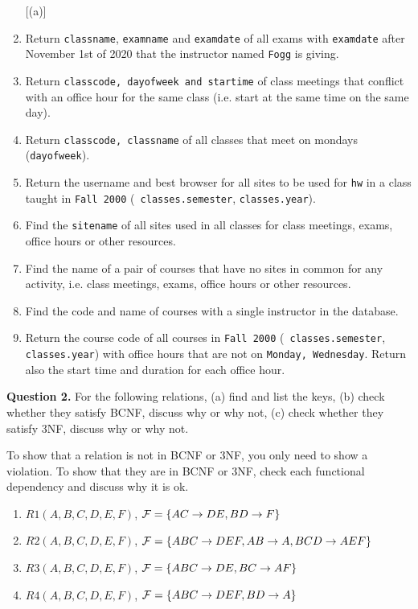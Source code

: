 \documentclass[11pt]{article}
\begin{document}
\begin{enumerate}  [(a)]
\item Return {\tt classname}, {\tt examname} and {\tt examdate} of
  all exams with {\tt examdate} after November 1st of 2020 that the
  instructor named {\tt Fogg} is giving.

\item Return {\tt classcode, dayofweek and startime} of class meetings
  that conflict with an office hour for the same class (i.e. start at
  the same time on the same day).
  
\item Return {\tt classcode, classname} of all classes that meet on
  mondays ({\tt dayofweek}).
  
\item Return the username and best browser for all sites to be used
  for {\tt hw} in a class taught in {\tt Fall 2000} ({\tt
    classes.semester}, {\tt classes.year}).  

\item Find the {\tt sitename} of all sites used in all classes for
  class meetings, exams, office hours or other resources.

\item Find the name of a pair of courses that have no sites in common
  for any activity, i.e. class meetings, exams, office hours or other
  resources.

\item Find the code and name of courses with a single instructor in
  the database.

\item Return the course code of all courses in {\tt Fall 2000} ({\tt
  classes.semester}, {\tt classes.year}) with office hours that are
  not on {\tt Monday, Wednesday}. Return also the start time and duration
  for each office hour.
\end{enumerate}

{\bf Question 2.} For the following relations, (a) find and list the
keys, (b) check whether they satisfy BCNF, discuss why or why not, (c)
check whether they satisfy 3NF, discuss why or why not.

To show that a relation is not in BCNF or 3NF, you only need to show a
violation. To show that they are in BCNF or 3NF, check each functional
dependency and discuss why it is ok.

\begin{enumerate}

\item $R1(A,B,C,D,E,F)$, ${\cal F} = \{AC\rightarrow DE, BD\rightarrow F \}$

\item $R2(A,B,C,D,E,F)$, ${\cal F} = \{ABC\rightarrow DEF,
  AB\rightarrow A, BCD\rightarrow AEF \}$

\item $R3(A,B,C,D,E,F)$, ${\cal F} = \{ABC\rightarrow DE, BC\rightarrow AF \}$

\item $R4(A,B,C,D,E,F)$, ${\cal F} = \{ABC\rightarrow DEF, BD\rightarrow A \}$
  
\end{enumerate}
\end{document}
